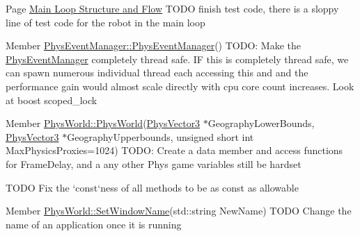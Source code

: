 \label{todo__todo000010}
\hypertarget{todo__todo000010}{}
 
\begin{DoxyDescription}
\item[Page \hyperlink{mainloop1}{Main Loop Structure and Flow} ]TODO finish test code, there is a sloppy line of test code for the robot in the main loop 
\end{DoxyDescription}

\label{todo__todo000005}
\hypertarget{todo__todo000005}{}
 
\begin{DoxyDescription}
\item[Member \hyperlink{classPhysEventManager_a217e7f6006aaf5e08e2872fa4d66e5e2}{PhysEventManager::PhysEventManager}() ]TODO: Make the \hyperlink{classPhysEventManager}{PhysEventManager} completely thread safe. IF this is completely thread safe, we can spawn numerous individual thread each accessing this and and the performance gain would almost scale directly with cpu core count increases. Look at boost scoped\_\-lock 
\end{DoxyDescription}

\label{todo__todo000012}
\hypertarget{todo__todo000012}{}
 
\begin{DoxyDescription}
\item[Member \hyperlink{classPhysWorld_a3228c98369082139722d3c918d735e6c}{PhysWorld::PhysWorld}(\hyperlink{classPhysVector3}{PhysVector3} $\ast$GeographyLowerBounds, \hyperlink{classPhysVector3}{PhysVector3} $\ast$GeographyUpperbounds, unsigned short int MaxPhysicsProxies=1024) ]TODO: Create a data member and access functions for FrameDelay, and a any other Phys game variables still be hardset 

TODO Fix the `const`ness of all methods to be as const as allowable 
\end{DoxyDescription}

\label{todo__todo000011}
\hypertarget{todo__todo000011}{}
 
\begin{DoxyDescription}
\item[Member \hyperlink{classPhysWorld_adb5ba2b5a3140c5d7033d3180e3f7342}{PhysWorld::SetWindowName}(std::string NewName) ]TODO Change the name of an application once it is running 
\end{DoxyDescription}